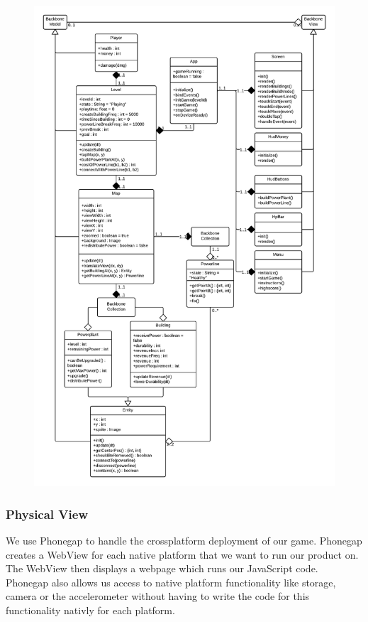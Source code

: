 \begin{figure}[H]
\centering
\includegraphics[width=\textwidth, height=\textheight, keepaspectratio]{pictures/class_diagram}
\end{figure}

\subsubsection*{Physical View}

We use Phonegap to handle the crossplatform deployment of our game. Phonegap creates a WebView for
each native platform that we want to run our product on. The WebView then displays a webpage which
runs our JavaScript code. Phonegap also allows us access to native platform functionality like
storage, camera or the accelerometer without having to write the code for this functionality nativly
for each platform.


